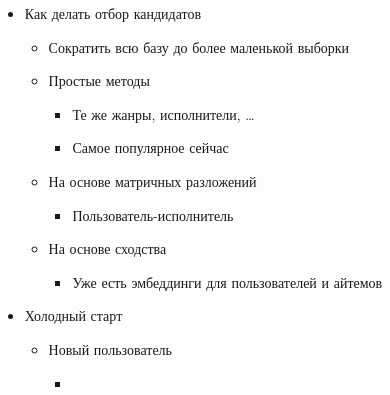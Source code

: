 \documentclass[a4paper, 12pt]{article}
\begin{document}
\begin{itemize}
\item
  
  Как делать отбор кандидатов
  

  \begin{itemize}
  \item
    
    Сократить всю базу до более маленькой выборки
    
  \item
    
    Простые методы
    

    \begin{itemize}
    \item
      
      Те же жанры, исполнители, \ldots{}
      
    \item
      
      Самое популярное сейчас
      
    \end{itemize}
  \item
    
    На основе матричных разложений
    

    \begin{itemize}
    \item
      
      Пользователь-исполнитель
      
    \end{itemize}
  \item
    
    На основе сходства
    

    \begin{itemize}
    \item
      
      Уже есть эмбеддинги для пользователей и айтемов
      
    \end{itemize}
  \end{itemize}
\item
  
  Холодный старт
  

  \begin{itemize}
  \item
    
    Новый пользователь
    

    \begin{itemize}
    \item
      

\end{itemize}
\end{itemize}
\end{itemize}
\end{document}
